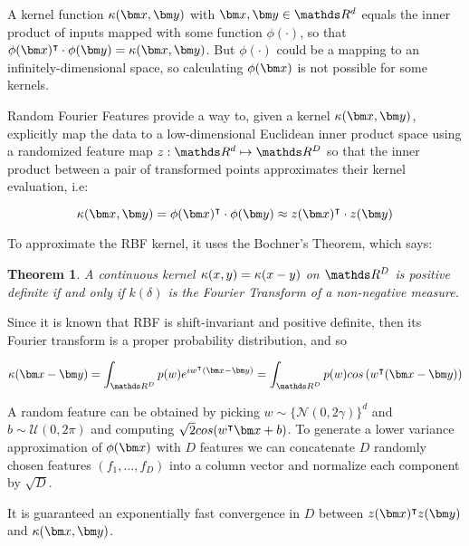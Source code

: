 \begin{pre-delivery}
  A kernel function
  $\kernel(\vx, \vy)$ with $\vx, \vy \in \reals^d$
  equals the inner product of inputs mapped with some function $\phi(\cdot)$,
  so that
  $\phi(\vx)^\transp\cdot\phi(\vy) = \kernel(\vx, \vy)$.
  But $\phi(\cdot)$ could be a mapping to an infinitely-dimensional space, so
  calculating $\phi(\vx)$ is not possible for some kernels.

  Random Fourier Features\cite{rahimi2008random} provide a way to, given a
  kernel $\kernel(\vx, \vy)$,
  explicitly map the data to a
  low-dimensional Euclidean inner product space using a randomized feature
  map $z: \reals^d \mapsto \reals^D$ so that the inner product between a pair
  of transformed points approximates their kernel evaluation, i.e:

  \begin{equation}
    \kernel(\vx, \vy) = \phi(\vx)^\transp\cdot\phi(\vy) \approx z(\vx)^\transp\cdot z(\vy)
  \end{equation}

  To approximate the RBF kernel, it uses the Bochner's Theorem, which says:

\newtheorem{theorem}{Theorem}
  \begin{theorem}
    \cite{rudin1962fourier}
    A continuous kernel $\kappa(x, y) = \kappa(x - y)$ on $\reals^D$  is
    positive definite if and only if $k(\delta)$ is the
    Fourier Transform of a non-negative measure.
  \end{theorem}


  Since it is known that RBF is shift-invariant and positive definite, then
  its Fourier transform is a proper probability distribution, and so

  \begin{equation}
    \kernel(\vx - \vy) = \int_{\reals^D} p(w)e^{iw^\transp (\vx-\vy)}
    = \int_{\reals^D} p(w)cos\left(w^\transp (\vx-\vy)\right)
  \end{equation}

  A random feature can be obtained by picking $w \sim \{\mathcal{N}(0, 2\gamma)\}^d$
  and $b \sim \mathcal{U}(0, 2\pi)$
  and computing $\sqrt{2}cos(w^\transp\vx + b)$. To generate a lower variance
  approximation of $\phi(\vx)$ with $D$ features we can concatenate $D$ randomly
  chosen features $(f_1, \ldots, f_D)$ into a column vector and normalize each
  component by $\sqrt{D}$.

  It is guaranteed an exponentially fast convergence in $D$ between
  $z(\vx)^\transp z(\vy)$ and $\kernel(\vx, \vy)$.

\end{pre-delivery}

